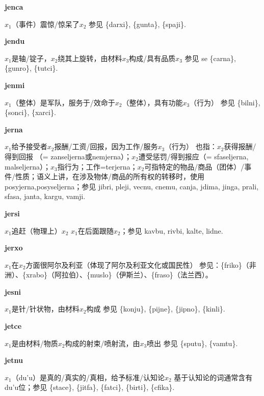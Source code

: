 \documentclass[notitlepage,twocolumn,a4paper,10pt]{book}
\begin{document}
{\sffamily\bfseries jenca}\enspace {\ttfamily\bfseries[jen]}  $x_1$（事件）震惊\slash{}惊呆了$x_2$ \textemdash{} 参见 \{darxi\}, \{gunta\}, \{spaji\}.

{\sffamily\bfseries jendu}\enspace {\ttfamily\bfseries[jed]}  $x_1$是轴\slash{}锭子，$x_2$绕其上旋转，由材料$x_3$构成\slash{}具有品质$x_3$ \textemdash{} 参见 se \{carna\}, \{gunro\}, \{tutci\}.

{\sffamily\bfseries jenmi}  $x_1$（整体）是军队，服务于\slash{}效命于$x_2$（整体），具有功能$x_3$（行为） \textemdash{} 参见 \{bilni\}, \{sonci\}, \{xarci\}.

{\sffamily\bfseries jerna} $x_1$给予接受者$x_2$报酬\slash{}工资\slash{}回报，因为工作\slash{}服务$x_3$（行为） \textemdash{} 也指：$x_2$获得报酬\slash{}得到回报 （= {zanseljerna}或{nemjerna}）；$x_2$遭受惩罚\slash{}得到报应（= {sfaseljerna}, {malseljerna}）；$x_3$指行为；工作={terjerna}；$x_2$可指特定的物品\slash{}商品（团体）\slash{}事件\slash{}性质；语义上讲，在涉及物体\slash{}商品的所有权的转移时，使用{posyjerna},{posyseljerna}；参见 {jibri}, {pleji}, {vecnu}, {cnemu}, {canja}, {jdima}, {jinga}, {prali}, {sfasa}, {janta}, {kargu}, {vamji}.

{\sffamily\bfseries jersi}\enspace {\ttfamily\bfseries[        je'i]}  $x_1$追赶（物理上）$x_2$ \textemdash{} $x_1$在后面跟随$x_2$；参见 {kavbu}, {rivbi}, {kalte}, {lidne}.

{\sffamily\bfseries jerxo}\enspace {\ttfamily\bfseries[jex]}  $x_1$在$x_2$方面很阿尔及利亚（体现了阿尔及利亚文化或国民性） \textemdash{} 参见：\{friko\}（非洲）、\{xrabo\}（阿拉伯）、\{muslo\}（伊斯兰）、\{fraso\}（法兰西）。

{\sffamily\bfseries jesni}\enspace {\ttfamily\bfseries[jes]}  $x_1$是针\slash{}针状物，由材料$x_2$构成 \textemdash{} 参见 \{konju\}, \{pijne\}, \{jipno\}, \{kinli\}.

{\sffamily\bfseries jetce}\enspace {\ttfamily\bfseries[        je'e]}  $x_1$是由材料\slash{}物质$x_2$构成的射束\slash{}喷射流，由$x_3$喷出 \textemdash{} 参见 \{sputu\}, \{vamtu\}.

{\sffamily\bfseries jetnu}\enspace {\ttfamily\bfseries[jet     je'u]}  $x_1$（du'u）是真的\slash{}真实的\slash{}真相，给予标准\slash{}认知论$x_2$ \textemdash{} 基于认知论的词通常含有du'u位；参见 \{stace\}, \{jitfa\}, \{fatci\}, \{birti\}, \{cfika\}.
\end{document}
